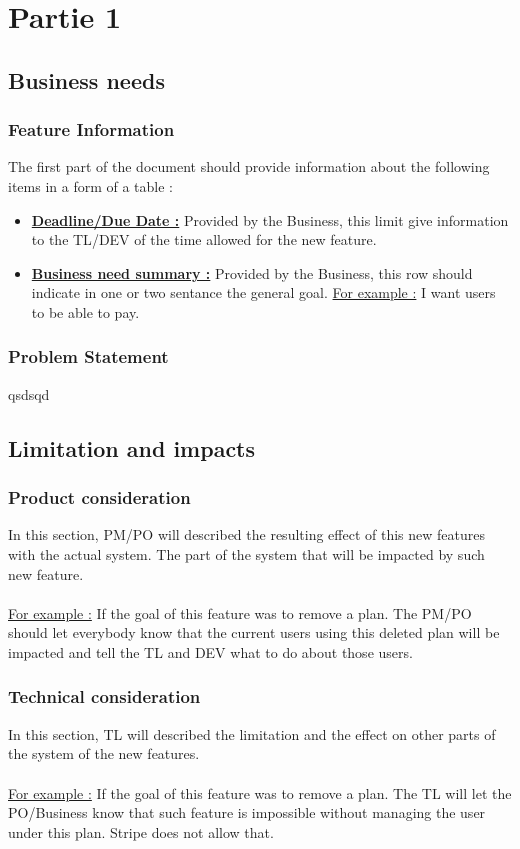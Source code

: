 \documentclass{book}
\begin{document}
\tableofcontents
\part{Partie 1}
    \chapter{Business needs}
        \section{Feature Information}
        The first part of the document should provide information about the following items in a form of a table :
        \begin{itemize}
  			\item \textbf{\underline{Deadline/Due Date :}} Provided by the \gls{Business}, this limit give information to the \gls{TL}/\gls{DEV} of the time allowed for the new feature.
  			 \item \textbf{\underline{Business need summary :}} Provided by the \gls{Business}, this row should indicate in one or two sentance the general goal. \underline{For example :} I want users to be able to pay.
		\end{itemize}
        \section{Problem Statement}
            qsdsqd
     \chapter{Limitation and impacts}
        \section{Product consideration}
        In this section, \gls{PM}/\gls{PO} will described the resulting effect of this new features with the actual system. The part of the system that will be impacted by such new feature.
        \\\\
        \underline{For example :}
        If the goal of this feature was to remove a plan. The \gls{PM}/\gls{PO} should let everybody know that the current users using this deleted plan will be impacted and tell the \gls{TL} and \gls{DEV} what to do about those users. 
        \section{Technical consideration}
        In this section, \gls{TL} will described the limitation and the effect on other parts of the system of the new features.
		\\\\       
        \underline{For example :}
        If the goal of this feature was to remove a plan. The \gls{TL} will let the \gls{PO}/\gls{Business} know that such feature is impossible without managing the user under this plan. Stripe does not allow that. 
\end{document}
